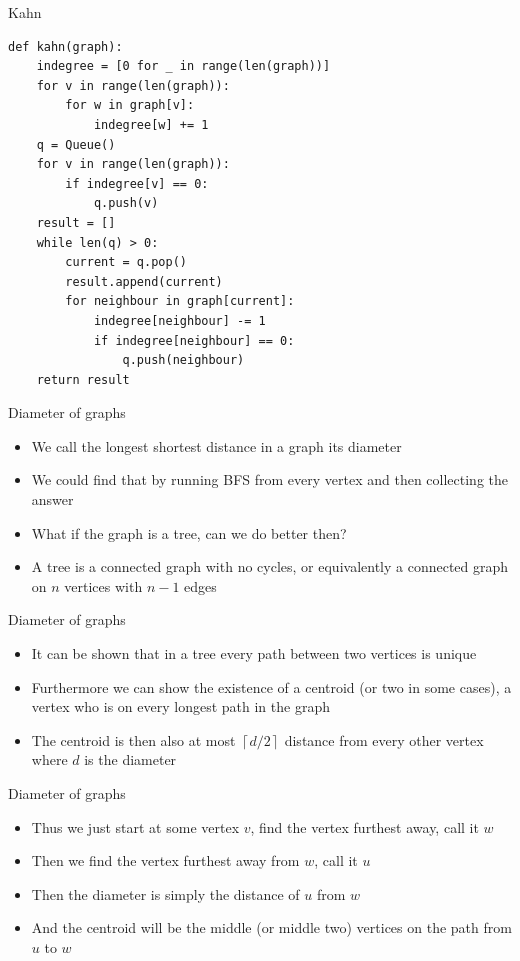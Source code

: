 \documentclass{beamer}
\newcommand\ceil[1]{\left\lceil#1\right\rceil}
\begin{document}
\begin{frame}{Kahn}

    \begin{verbatim}
def kahn(graph):
	indegree = [0 for _ in range(len(graph))]
	for v in range(len(graph)):
		for w in graph[v]:
			indegree[w] += 1 
	q = Queue()
	for v in range(len(graph)):
		if indegree[v] == 0:
			q.push(v)
	result = []
	while len(q) > 0:
		current = q.pop()
		result.append(current)
		for neighbour in graph[current]:
			indegree[neighbour] -= 1
			if indegree[neighbour] == 0:
				q.push(neighbour)
	return result
    \end{verbatim}
\end{frame}

\begin{frame}[plain]{Diameter of graphs}
    \vspace{5pt}
    \begin{itemize}
        \item We call the longest shortest distance in a graph its diameter
        \item We could find that by running BFS from every vertex and then collecting the answer
        \item What if the graph is a tree, can we do better then?
        \item A tree is a connected graph with no cycles, or equivalently a connected graph on $n$ vertices with $n - 1$ edges
    \end{itemize}
\end{frame}

\begin{frame}[plain]{Diameter of graphs}
    \vspace{5pt}
    \begin{itemize}
        \item It can be shown that in a tree every path between two vertices is unique
        \item Furthermore we can show the existence of a centroid (or two in some cases), a vertex who is on every longest path in the graph
        \item The centroid is then also at most $\ceil{d/2}$ distance from every other vertex where $d$ is the diameter
    \end{itemize}
\end{frame}

\begin{frame}[plain]{Diameter of graphs}
    \vspace{5pt}
    \begin{itemize}
        \item Thus we just start at some vertex $v$, find the vertex furthest away, call it $w$
        \item Then we find the vertex furthest away from $w$, call it $u$
        \item Then the diameter is simply the distance of $u$ from $w$
        \item And the centroid will be the middle (or middle two) vertices on the path from $u$ to $w$
    \end{itemize}
\end{frame}
\end{document}
